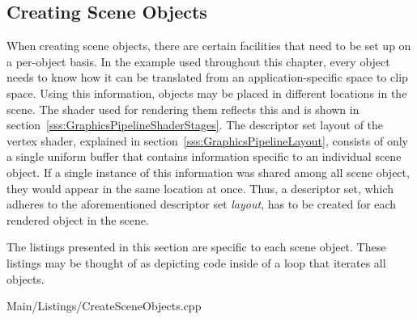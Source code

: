       \subsection{Creating Scene Objects}
        \label{sss:CreatingSceneObjects}

        When creating scene objects, there are certain facilities that need to be set up on a per-object basis.
        In the example used throughout this chapter, every object needs to know how it can be translated from an application-specific space to clip space.
        Using this information, objects may be placed in different locations in the scene.
        The shader used for rendering them reflects this and is shown in section~\ref{sss:GraphicsPipelineShaderStages}.
        The descriptor set layout of the vertex shader, explained in section~\ref{sss:GraphicsPipelineLayout}, consists of only a single uniform buffer that contains information specific to an individual scene object.
        If a single instance of this information was shared among all scene object, they would appear in the same location at once.
        Thus, a descriptor set, which adheres to the aforementioned descriptor set \textit{layout}, has to be created for each rendered object in the scene.

        The listings presented in this section are specific to each scene object.
        These listings may be thought of as depicting code inside of a loop that iterates all objects.

        
        {Main/Listings/CreateSceneObjects.cpp}

